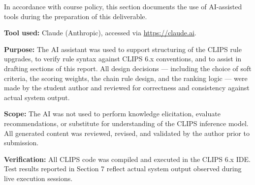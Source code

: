 \documentclass[12pt,a4paper]{article}
\begin{document}
In accordance with course policy, this section documents the use of AI-assisted tools during the preparation of this deliverable.

\textbf{Tool used:} Claude (Anthropic), accessed via \url{https://claude.ai}.

\textbf{Purpose:} The AI assistant was used to support structuring of the CLIPS rule upgrades, to verify rule syntax against CLIPS 6.x conventions, and to assist in drafting sections of this report. All design decisions --- including the choice of soft criteria, the scoring weights, the chain rule design, and the ranking logic --- were made by the student author and reviewed for correctness and consistency against actual system output.

\textbf{Scope:} The AI was not used to perform knowledge elicitation, evaluate recommendations, or substitute for understanding of the CLIPS inference model. All generated content was reviewed, revised, and validated by the author prior to submission.

\textbf{Verification:} All CLIPS code was compiled and executed in the CLIPS 6.x IDE. Test results reported in Section 7 reflect actual system output observed during live execution sessions.
\end{document}
